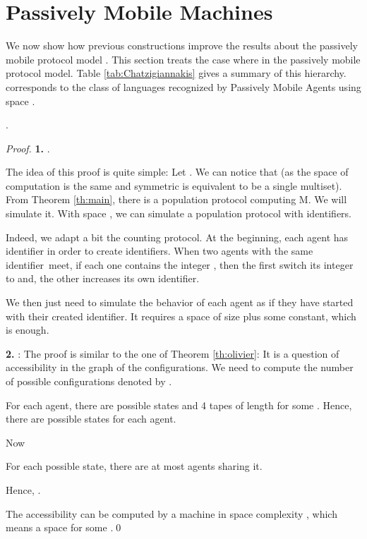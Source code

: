 \documentclass[UKenglish]{llncs}
\newcommand\id{identifier}
\begin{document}
\section{Passively Mobile Machines}
\label{sec:4demi}


We now show how previous constructions
 improve the results about the passively mobile protocol model  \cite{chatzigiannakis2011passively}.
This section treats the case where  in the
passively mobile protocol model. Table \ref{tab:Chatzigiannakis} gives a summary of this hierarchy.
 corresponds to the class of languages recognized
by Passively Mobile Agents using space .











\begin{theorem}\label{th:grec}
.\end{theorem}
\begin{proof}
\textbf{1.} .

The idea of this proof is quite simple: Let .
We can notice that  
(as the space of computation is the same and symmetric is equivalent
to be a single multiset).
From Theorem \ref{th:main}, there is a population protocol computing M. We will simulate it.
With space , we can simulate
a population protocol with  identifiers.

Indeed, we adapt a bit the counting protocol.
 At the beginning, each agent has identifier  in order to create  identifiers.
When two agents with the same \id\ meet, if each one contains the integer , then
the first switch its integer to  and, the other increases its own \id.

We then just need to simulate the behavior of each agent as if they have started 
with their created \id. It requires a space of size  plus some constant,
which is enough.

\textbf{2.} :
The proof is similar to the one of Theorem \ref{th:olivier}:
It is a question of accessibility in the  graph of the configurations.
We need to compute the number of possible configurations denoted by .

For each agent, there are  possible states and 4 tapes of length
 for some . Hence, there are 
possible states for each agent.

Now 

For each possible state, there are at most  agents sharing it.

Hence, .


The accessibility can be computed by a machine in space complexity
, which means a space  for some .\hfill \qed

 \end{proof}
\end{document}
